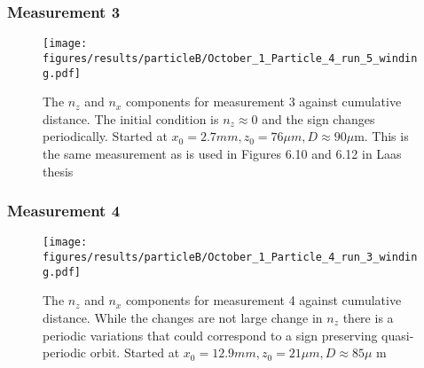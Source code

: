 \subsubsection{Measurement 3}
\begin{figure}[H]
\begin{center}
\texttt{[image: figures/results/particleB/October\_1\_Particle\_4\_run\_5\_winding.pdf]}
\end{center}
\caption{The $n_z$ and $n_x$ components for measurement 3 against cumulative distance. The initial condition is $n_z \approx 0$ and the sign changes periodically. Started at $x_0 = 2.7 mm, z_0 = 76\mu m, D \approx 90\mu$m. This is the same measurement as is used in Figures 6.10 and 6.12 in Laas thesis~\cite{alexanderThesis}}
\label{fig:particleB3}
\end{figure}


\subsubsection{Measurement 4}
\begin{figure}[H]
\begin{center}
\texttt{[image: figures/results/particleB/October\_1\_Particle\_4\_run\_3\_winding.pdf]}
\end{center}
\caption{The $n_z$ and $n_x$ components for measurement 4 against cumulative distance. While the changes are not large change in $n_z$ there is a periodic variations that could correspond to a sign preserving quasi-periodic orbit. Started at $x_0 = 12.9 mm, z_0 = 21\mu m, D \approx 85\mu$ m}
\label{fig:particleB4}
\end{figure}